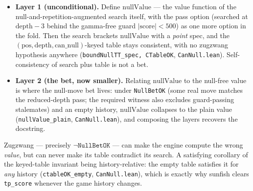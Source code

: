 \documentclass[11pt]{article}
\newcommand{\leanref}[2]{(\texttt{#1}, \texttt{#2})}%
\theoremstyle{plain}
\theoremstyle{definition}
\theoremstyle{remark}
\begin{document}
\begin{itemize}
  \item \textbf{Layer 1 (unconditional).}  Define
    $\mathrm{nullValue}$ --- the value function of the
    null-and-repetition-augmented search itself, with the pass option
    (searched at $\mathrm{depth}-3$ behind the gamma-free guard
    $|\mathrm{score}| < 500$) as one more option in the fold.  Then the
    search brackets $\mathrm{nullValue}$ with a \emph{point} spec, and
    the $(\mathrm{pos}, \mathrm{depth}, \mathrm{can\_null})$-keyed table
    stays consistent, with no zugzwang hypothesis anywhere
    \leanref{boundNullTT\_spec, CTableOK}{CanNull.lean}.
    Self-consistency of search plus table is not a bet.
  \item \textbf{Layer 2 (the bet, now smaller).}  Relating
    $\mathrm{nullValue}$ to the null-free value is where the null-move
    bet lives: under \texttt{NullBetOK} (some real move matches the
    reduced-depth pass; the required witness also excludes guard-passing
    stalemates) and an empty history, $\mathrm{nullValue}$ collapses to
    the plain value \leanref{nullValue\_plain}{CanNull.lean}, and
    composing the layers recovers the docstring.
\end{itemize}

Zugzwang --- precisely $\neg\texttt{NullBetOK}$ --- can make the engine
compute the wrong \emph{value}, but can never make its table contradict
its search.  A satisfying corollary of the keyed-table invariant being
history-relative: the empty table satisfies it for \emph{any} history
\leanref{ctableOK\_empty}{CanNull.lean}, which is exactly why sunfish
clears \texttt{tp\_score} whenever the game history changes.
\end{document}
